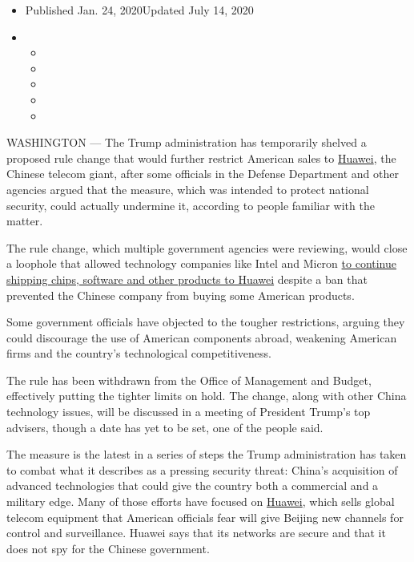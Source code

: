 \begin{itemize}
\item
  Published Jan. 24, 2020Updated July 14, 2020
\item
  \begin{itemize}
  \item
  \item
  \item
  \item
  \item
  \end{itemize}
\end{itemize}

WASHINGTON --- The Trump administration has temporarily shelved a
proposed rule change that would further restrict American sales to
\href{https://www.nytimes.com/2020/07/14/business/huawei-uk-5g.html}{Huawei},
the Chinese telecom giant, after some officials in the Defense
Department and other agencies argued that the measure, which was
intended to protect national security, could actually undermine it,
according to people familiar with the matter.

The rule change, which multiple government agencies were reviewing,
would close a loophole that allowed technology companies like Intel and
Micron
\href{https://www.nytimes.com/2019/06/25/technology/huawei-trump-ban-technology.html}{to
continue shipping chips, software and other products to Huawei} despite
a ban that prevented the Chinese company from buying some American
products.

Some government officials have objected to the tougher restrictions,
arguing they could discourage the use of American components abroad,
weakening American firms and the country's technological
competitiveness.

The rule has been withdrawn from the Office of Management and Budget,
effectively putting the tighter limits on hold. The change, along with
other China technology issues, will be discussed in a meeting of
President Trump's top advisers, though a date has yet to be set, one of
the people said.

The measure is the latest in a series of steps the Trump administration
has taken to combat what it describes as a pressing security threat:
China's acquisition of advanced technologies that could give the country
both a commercial and a military edge. Many of those efforts have
focused on
\href{https://www.nytimes.com/2020/05/15/business/economy/commerce-department-huawei.html}{Huawei},
which sells global telecom equipment that American officials fear will
give Beijing new channels for control and surveillance. Huawei says that
its networks are secure and that it does not spy for the Chinese
government.

